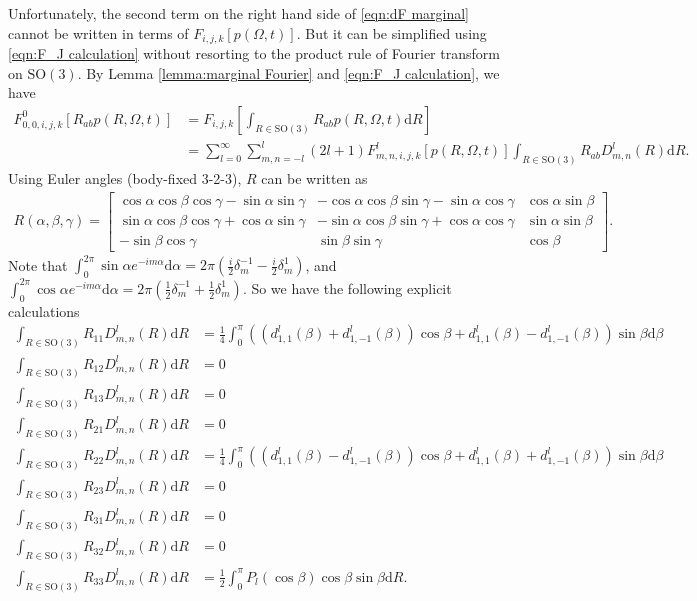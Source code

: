 \documentclass[10pt]{article}
\newcommand{\SO}{\ensuremath{\mathrm{SO}(3)}}
\newcommand{\diff}[1]{\mathrm{d}#1}
\begin{document}
Unfortunately, the second term on the right hand side of \eqref{eqn:dF marginal} cannot be written in terms of $F_{i,j,k}[p(\Omega,t)]$.
But it can be simplified using \eqref{eqn:F_J calculation} without resorting to the product rule of Fourier transform on $\SO$.
By Lemma \ref{lemma:marginal Fourier} and \eqref{eqn:F_J calculation}, we have
\begin{align*}
	F^0_{0,0,i,j,k}[R_{ab}p(R,\Omega,t)] &= F_{i,j,k}\left[ \int_{R\in\SO} R_{ab}p(R,\Omega,t) \diff{R} \right] \\
	&= \sum_{l=0}^\infty \sum_{m,n=-l}^l (2l+1) F^l_{m,n,i,j,k}[p(R,\Omega,t)] \int_{R\in\SO} R_{ab}D^l_{m,n}(R) \diff{R}.
\end{align*}
Using Euler angles (body-fixed 3-2-3), $R$ can be written as
\begin{align}
	R(\alpha,\beta,\gamma) = \begin{bmatrix}
		\cos\alpha\cos\beta\cos\gamma-\sin\alpha\sin\gamma & -\cos\alpha\cos\beta\sin\gamma-\sin\alpha\cos\gamma & \cos\alpha\sin\beta \\
		\sin\alpha\cos\beta\cos\gamma+\cos\alpha\sin\gamma & -\sin\alpha\cos\beta\sin\gamma+\cos\alpha\cos\gamma & \sin\alpha\sin\beta \\
		-\sin\beta\cos\gamma & \sin\beta\sin\gamma & \cos\beta
	\end{bmatrix}.
\end{align}
Note that $\int_0^{2\pi}\sin\alpha e^{-im\alpha} \diff{\alpha} = 2\pi\left( \frac{i}{2}\delta_m^{-1} - \frac{i}{2}\delta_m^1 \right)$, and $\int_0^{2\pi}\cos\alpha e^{-im\alpha} \diff{\alpha} = 2\pi\left( \frac{1}{2}\delta_m^{-1} + \frac{1}{2}\delta_m^1 \right)$.
So we have the following explicit calculations
\begin{align*}
	\int_{R\in\SO} R_{11}D^l_{m,n}(R) \diff{R} &= \frac{1}{4} \int_0^\pi \left( \left(d^l_{1,1}(\beta) + d^l_{1,-1}(\beta)\right)\cos\beta + d^l_{1,1}(\beta) - d^l_{1,-1}(\beta) \right) \sin\beta \diff{\beta}  \\
	\int_{R\in\SO} R_{12}D^l_{m,n}(R) \diff{R} &= 0 \\
	\int_{R\in\SO} R_{13}D^l_{m,n}(R) \diff{R} &= 0 \\
	\int_{R\in\SO} R_{21}D^l_{m,n}(R) \diff{R} &= 0 \\
	\int_{R\in\SO} R_{22}D^l_{m,n}(R) \diff{R} &= \frac{1}{4} \int_0^\pi \left( \left(d^l_{1,1}(\beta) - d^l_{1,-1}(\beta)\right)\cos\beta + d^l_{1,1}(\beta) + d^l_{1,-1}(\beta) \right) \sin\beta \diff{\beta} \\
	\int_{R\in\SO} R_{23}D^l_{m,n}(R) \diff{R} &= 0 \\
	\int_{R\in\SO} R_{31}D^l_{m,n}(R) \diff{R} &= 0 \\
	\int_{R\in\SO} R_{32}D^l_{m,n}(R) \diff{R} &= 0 \\
	\int_{R\in\SO} R_{33}D^l_{m,n}(R) \diff{R} &= \frac{1}{2} \int_0^\pi P_l(\cos\beta) \cos\beta \sin\beta \diff{R}.
\end{align*}
\end{document}
